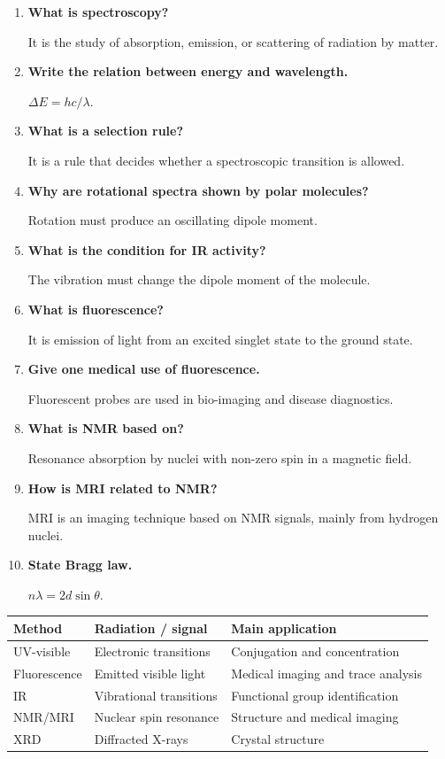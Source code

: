 \documentclass[12pt,a4paper]{article}
\newcommand{\Q}[1]{\textbf{#1}\par\noindent\ignorespaces}
\begin{document}
\begin{tcolorbox}[exambox, title={Frequently Asked / Viva Questions}]
\begin{enumerate}[topsep=0pt, label=\textbf{Q\arabic*.}, itemsep=5pt]
  \item \Q{What is spectroscopy?}
    It is the study of absorption, emission, or scattering of radiation by matter.
  \item \Q{Write the relation between energy and wavelength.}
    $\Delta E=hc/\lambda$.
  \item \Q{What is a selection rule?}
    It is a rule that decides whether a spectroscopic transition is allowed.
  \item \Q{Why are rotational spectra shown by polar molecules?}
    Rotation must produce an oscillating dipole moment.
  \item \Q{What is the condition for IR activity?}
    The vibration must change the dipole moment of the molecule.
  \item \Q{What is fluorescence?}
    It is emission of light from an excited singlet state to the ground state.
  \item \Q{Give one medical use of fluorescence.}
    Fluorescent probes are used in bio-imaging and disease diagnostics.
  \item \Q{What is NMR based on?}
    Resonance absorption by nuclei with non-zero spin in a magnetic field.
  \item \Q{How is MRI related to NMR?}
    MRI is an imaging technique based on NMR signals, mainly from hydrogen nuclei.
  \item \Q{State Bragg law.}
    $n\lambda=2d\sin\theta$.
\end{enumerate}
\end{tcolorbox}

\begin{tcolorbox}[tikzbox, title={Summary Reference Table}]
\begin{tabularx}{\linewidth}{|B{3cm}|Y|Y|}
\hline
\textbf{Method} & \textbf{Radiation / signal} & \textbf{Main application} \\
\hline
UV-visible & Electronic transitions & Conjugation and concentration \\
\hline
Fluorescence & Emitted visible light & Medical imaging and trace analysis \\
\hline
IR & Vibrational transitions & Functional group identification \\
\hline
NMR/MRI & Nuclear spin resonance & Structure and medical imaging \\
\hline
XRD & Diffracted X-rays & Crystal structure \\
\hline
\end{tabularx}
\end{tcolorbox}
\end{document}
